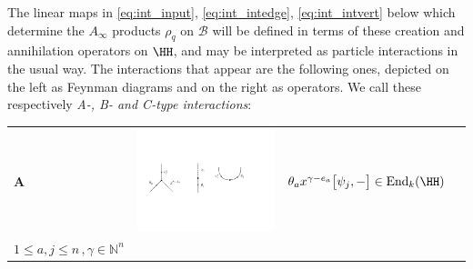 \documentclass[english,letter paper,12pt,leqno]{article}
\theoremstyle{example}
\numberwithin{equation}{section}
\DeclareMathOperator{\End}{End}
\begin{document}
The linear maps in \eqref{eq:int_input}, \eqref{eq:int_intedge}, \eqref{eq:int_intvert} below which determine the $A_\infty$ products $\rho_q$ on $\mathscr{B}$ will be defined in terms of these creation and annihilation operators on $\HH$, and may be interpreted as particle interactions in the usual way. The interactions that appear are the following ones, depicted on the left as Feynman diagrams and on the right as operators. We call these respectively \emph{A-, B- and C-type interactions}:

\begin{center}
\begin{tabular}{ >{\centering}m{1cm} >{\centering}m{4cm} >{\centering}m{8cm} >{\centering}m{1cm}}
\textbf{A}
&
\includegraphics[scale=0.4]{dia2}
&
$\theta_a x^{\gamma - e_a} \big[\psi_j, -\big] \in \End_k( \HH )$\\
\vspace{0.5cm}
$1 \le a,j \le n\,, \gamma \in \mathbb{N}^n$
&
\tagarray{\label{interaction_1}}
\end{tabular}
\end{center}
\end{document}
